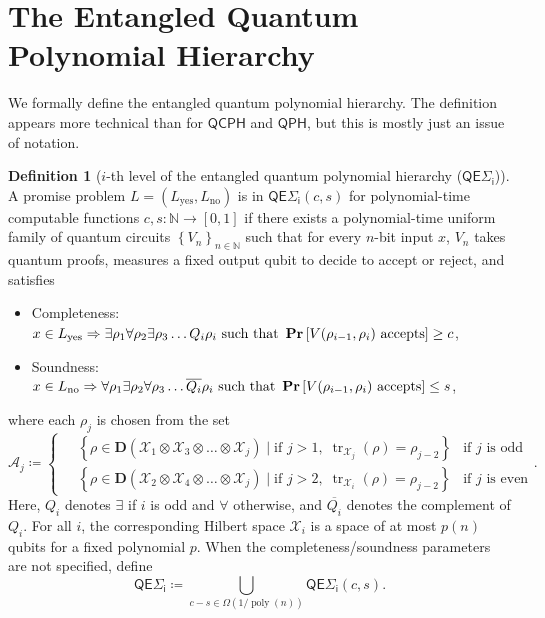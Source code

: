\documentclass[10pt,a4paper]{article}
\theoremstyle{definition}
\newtheorem{definition}[theorem]{Definition}
\renewcommand{\Pr}{\mathop{\bf Pr\/}}
\DeclareMathOperator{\tr}{tr}
\DeclareMathOperator{\poly}{poly}
\newcommand{\yes}{\text{yes}}
\newcommand{\no}{\text{no}}
\newcommand{\nats}{\mathbb N}
\newcommand{\N}{\nats}
\newcommand{\class}[1]{\ensuremath{\mathsf{#1}}\xspace}
\newcommand{\QCPH}{\class{QCPH}}
\newcommand{\QPH}{\class{QPH}}
\newcommand{\entQSigmai}[1][i]{\class{QE\Sigma_{#1}}}
\newcommand{\calA}{\mathcal{A}}
\newcommand{\calX}{\mathcal{X}}
\begin{document}
\section{The Entangled Quantum Polynomial Hierarchy}\label{sec:prelim-entqph}

We formally define the entangled quantum polynomial hierarchy. 
The definition appears more technical than for $\QCPH$ and $\QPH$, but this is mostly just an issue of notation.

\begin{definition}[$i$-th level of the entangled quantum polynomial hierarchy ($\entQSigmai $)] \label{def:entqsigmai}
    A promise problem $L=(L_\yes, L_\no)$ is in $\entQSigmai(c,s)$ for polynomial-time computable functions $c, s: \N \to [0,1]$ if there exists a polynomial-time uniform family of quantum circuits $\left\{V_n \right\}_{n \in \N}$ such that for every $n$-bit input $x$, $V_n$ takes quantum proofs, measures a fixed output qubit to decide to accept or reject, and satisfies 
    \begin{itemize}
        \item Completeness: $ x \in L_\yes \Rightarrow  \exists \rho_1 \forall \rho_2 \exists \rho_3 \dots Q_i \rho_i \text{ such that } \Pr\left[ V(\rho_{i-1}, \rho_i) \text{ accepts}\right] \geq c $,
        \item Soundness: $ x\in L_\no \Rightarrow  \forall \rho_1 \exists \rho_2  \forall \rho_3 \dots \overline{Q_i} \rho_i  \text{ such that } \Pr\left[ V(\rho_{i-1}, \rho_i) \text{ accepts}\right] \leq s $,
    \end{itemize}
    where each $\rho_j$ is chosen from the set  
    \begin{equation*}
    \calA_j \coloneqq \begin{cases}
        \quad\left\{ \rho \in \mathbf{D}\left(\calX_1\otimes \calX_3 \otimes \dots \otimes \calX_{j}\right) \mid \text{if }j>1,\; \tr_{\calX_j}\left(\rho\right) = \rho_{j-2} \right\} & \text{if $j$ is odd}  \\
        \quad\left\{ \rho \in \mathbf{D}\left( \calX_2\otimes \calX_4 \otimes \dots \otimes \calX_{j}\right) \mid  \text{if }j>2,\; \tr_{\calX_i}\left(\rho\right) = \rho_{j-2} \right\} & \text{if $j$ is even}
    \end{cases} .
    \end{equation*}
    Here, $Q_i$ denotes $\exists$ if $i$ is odd and $\forall$ otherwise, and $\overline{Q_i}$ denotes the complement of $Q_i$. For all $i$, the corresponding Hilbert space $\calX_i$ is a space of at most $p(n)$ qubits for a fixed polynomial $p$.
    When the completeness/soundness parameters are not specified, define
    \[
        \entQSigmai[i] \coloneqq \bigcup_{c-s \in \Omega\left(1/\poly(n)\right)} \entQSigmai[i](c,s).
    \]
\end{definition}
\end{document}
